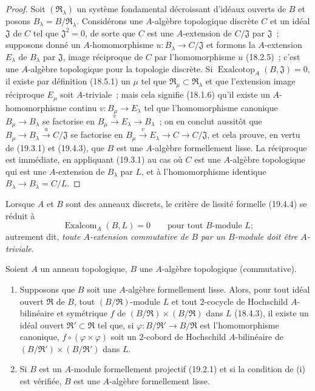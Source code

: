 \begin{proof}
Soit $(\mathfrak R_\lambda)$ un système fondamental décroissant d'idéaux
ouverts de $B$ et posons $B_\lambda=B/\mathfrak R_\lambda$.
Considérons une $A$-algèbre topologique discrète $C$ et un idéal
$\mathfrak J$ de $C$ tel que $\mathfrak J^2=0$, de sorte que $C$ est une
$A$-extension de $C/\mathfrak J$ par $\mathfrak J$~; supposons donné un
$A$-homomorphisme $u:B_\lambda\to C/\mathfrak J$ et formons la
$A$-extension $E_\lambda$ de $B_\lambda$ par $\mathfrak J$, image
réciproque de $C$ par l'homomorphisme $u$ (18.2.5)~; c'est une $A$-algèbre
topologique pour la topologie discrète. Si
$\operatorname{Exalcotop}_A(B,\mathfrak J)=0$, il existe par définition (18.5.1) un
$\mu$ tel que $\mathfrak R_\mu\subset\mathfrak R_\lambda$ et que
l'extension image réciproque $E_\mu$ soit $A$-triviale~; mais cela signifie
(18.1.6) qu'il existe un $A$-homomorphisme continu
$v:B_\mu\to E_\lambda$ tel que l'homomorphisme canonique
$B_\mu\to B_\lambda$ se factorise en
$B_\mu\xrightarrow{v}E_\lambda\to B_\lambda$~; on en conclut
aussitôt que $B_\mu\to B_\lambda\xrightarrow{u}C/\mathfrak J$ se
factorise en
$B_\mu\xrightarrow{v}E_\lambda\to C\to C/\mathfrak J$, et cela
prouve, en vertu de (19.3.1) et (19.4.3), que $B$ est une $A$-algèbre
formellement lisse. La réciproque est immédiate, en appliquant (19.3.1) au cas
où $C$ est une $A$-algèbre topologique qui est une $A$-extension de
$B_\lambda$ par $L$, et à l'homomorphisme identique
$B_\lambda\to B_\lambda=C/L$.
\end{proof}

Lorsque $A$ et $B$ sont des anneaux discrets, le critère de lissité formelle
(19.4.4) se réduit à
\begin{equation}
\tag{19.4.4.1}
\label{0.19.4.4.1-fr}
\operatorname{Exalcom}_A(B,L)=0\qquad\text{pour tout $B$-module $L$};
\end{equation}
autrement dit, \emph{toute $A$-extension commutative de $B$ par un
$B$-module doit être $A$-triviale}.

\begin{corollary}[19.4.5]
\label{0.19.4.5-fr}
Soient $A$ un anneau topologique, $B$ une $A$-algèbre topologique
(commutative).
\begin{enumerate}
  \item[(i)] Supposons que $B$ soit une $A$-algèbre formellement lisse.
  Alors, pour tout idéal ouvert $\mathfrak R$ de $B$, tout
  $(B/\mathfrak R)$-module $L$ et tout $2$-cocycle de Hochschild
  $A$-bilinéaire et symétrique $f$ de
  $(B/\mathfrak R)\times(B/\mathfrak R)$ dans $L$ (18.4.3), il existe un
  idéal ouvert $\mathfrak R'\subset\mathfrak R$ tel que, si
  $\varphi:B/\mathfrak R'\to B/\mathfrak R$ est l'homomorphisme
  canonique, $f\circ(\varphi\times\varphi)$ soit un $2$-cobord de
  Hochschild $A$-bilinéaire de
  $(B/\mathfrak R')\times(B/\mathfrak R')$ dans $L$.
  \item[(ii)] Si $B$ est un $A$-module formellement projectif (19.2.1) et si
  la condition de (i) est vérifiée, $B$ est une $A$-algèbre formellement
  lisse.
\end{enumerate}
\end{corollary}

